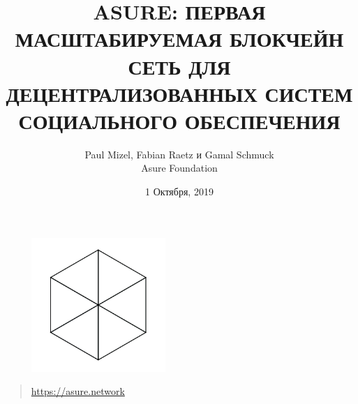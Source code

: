 \begin{figure}
    \centering
    \includegraphics[width=2.0in]{img/logo.png}
\end{figure}

\title{ASURE: ПЕРВАЯ МАСШТАБИРУЕМАЯ БЛОКЧЕЙН СЕТЬ ДЛЯ ДЕЦЕНТРАЛИЗОВАННЫХ СИСТЕМ СОЦИАЛЬНОГО ОБЕСПЕЧЕНИЯ}
\author{Paul Mizel, Fabian Raetz и Gamal Schmuck \\Asure Foundation}
\date{1 Октября, 2019}
\maketitle

\vskip 2.0in

\begin{quote}
	\centering
	\url{https://asure.network}
\end{quote}

\newpage 
